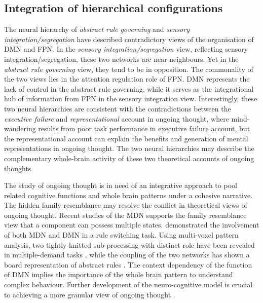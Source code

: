 \subsection{Integration of hierarchical configurations}

The neural hierarchy of \textit{abstract rule governing} and \textit{sensory integration/segregation} have described contradictory views of the organisation of DMN and FPN. In the \textit{sensory integration/segregation} view, reflecting sensory integration/segregation, these two networks are near-neighbours. Yet in the \textit{abstract rule governing} view, they tend to be in opposition.
The commonality of the two views lies in the attention regulation role of FPN. DMN represents the lack of control in the abstract rule governing, while it serves as the integrational hub of information from FPN in the sensory integration view. Interestingly, these two neural hierarchies are consistent with the contradictions between the \textit{executive failure} and \textit{representational} account in ongoing thought, where mind-wandering results from poor task performance in executive failure account, but the representational account can explain the benefits and generation of mental representations in ongoing thought. 
The two neural hierarchies may describe the complementary whole-brain activity of these two theoretical accounts of ongoing thoughts. 

The study of ongoing thought is in need of an integrative approach to pool related cognitive functions and whole brain patterns under a cohesive narrative. The hidden family resemblance may resolve the conflict in theoretical views of ongoing thought. Recent studies of the MDN supports the family resemblance view that a component can possess multiple states. %
 demonstrated the involvement of both MDN and DMN in a rule switching task. Using multi-voxel pattern analysis, two tightly knitted sub-processing with distinct role have been revealed in multiple-demand tasks \cite{Crittenden2015}, while the coupling of the two networks has shown a board representation of abstract rules \cite{Crittenden2016}. 
The context dependency of the function of DMN implies the importance of the whole brain pattern to understand complex behaviour. Further development of the neuro-cognitive model is crucial to achieving a more granular view of ongoing thought \cite{Mittner2016,SmallwoodFrontiers2013}. 

